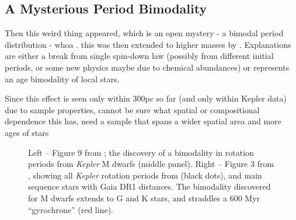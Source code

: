 \documentclass[12pt]{article}
\newcommand{\Kepler}{\textsl{Kepler}\xspace}
\begin{document}
\subsection{A Mysterious Period Bimodality}

Then this weird thing appeared, which is an open mystery - a bimodal period distribution - whoa \citep{mcquillan2013}. this was then extended to higher masses by \citet{davenport2017}. Explanations are either a break from single spin-down law (possibly from different initial periods, or some new physics maybe due to chemical abundances) or represents an age bimodality of local stars.

 Since this effect is seen only within 300pc so far (and only within Kepler data) due to sample properties, cannot be sure what spatial or compositional dependence this has, need a sample that spans a wider spatial area and more ages of stars

\begin{figure}[!th]
\centering
{}
\caption{
Left -- Figure 9 from \citet{mcquillan2013}; the discovery of a bimodality in rotation periods from \Kepler M dwarfs (middle panel).
Right -- Figure 3 from \citet{davenport2017}, showing all \Kepler rotation periods from \citet{mcquillan2014} (black dots), and main sequence stars with Gaia DR1 distances. The bimodality discovered for M dwarfs extends to G and K stars, and straddles  a 600 Myr ``gyrochrone'' (red line).
}
\label{fig:bimodal}
\end{figure}
\end{document}
